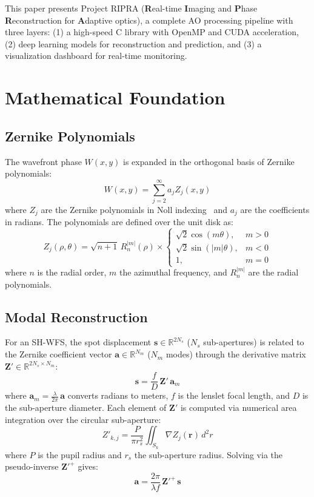 \documentclass[twocolumn,10pt]{IEEEtran}
\begin{document}
This paper presents Project RIPRA (\textbf{R}eal-time \textbf{I}maging and \textbf{P}hase \textbf{R}econstruction for \textbf{A}daptive optics), a complete AO processing pipeline with three layers: (1) a high-speed C library with OpenMP and CUDA acceleration, (2) deep learning models for reconstruction and prediction, and (3) a visualization dashboard for real-time monitoring.

\section{Mathematical Foundation}
\label{sec:math}

\subsection{Zernike Polynomials}
\label{sec:zernike}

The wavefront phase $W(x, y)$ is expanded in the orthogonal basis of Zernike polynomials:
\begin{equation}
W(x, y) = \sum_{j=2}^{\infty} a_j Z_j(x, y)
\end{equation}
where $Z_j$ are the Zernike polynomials in Noll indexing~\cite{noll1976zernike} and $a_j$ are the coefficients in radians. The polynomials are defined over the unit disk as:
\begin{equation}
Z_j(\rho, \theta) = \sqrt{n+1}\,R_n^{|m|}(\rho) \times
\begin{cases}
\sqrt{2}\cos(m\theta), & m > 0 \\
\sqrt{2}\sin(|m|\theta), & m < 0 \\
1, & m = 0
\end{cases}
\end{equation}
where $n$ is the radial order, $m$ the azimuthal frequency, and $R_n^{|m|}$ are the radial polynomials.

\subsection{Modal Reconstruction}
\label{sec:modal}

For an SH-WFS, the spot displacement $\mathbf{s} \in \mathbb{R}^{2N_s}$ ($N_s$ sub-apertures) is related to the Zernike coefficient vector $\mathbf{a} \in \mathbb{R}^{N_m}$ ($N_m$ modes) through the derivative matrix $\mathbf{Z}' \in \mathbb{R}^{2N_s \times N_m}$:
\begin{equation}
\mathbf{s} = \frac{f}{D}\,\mathbf{Z}'\,\mathbf{a}_m
\end{equation}
where $\mathbf{a}_m = \frac{\lambda}{2\pi}\,\mathbf{a}$ converts radians to meters, $f$ is the lenslet focal length, and $D$ is the sub-aperture diameter. Each element of $\mathbf{Z}'$ is computed via numerical area integration over the circular sub-aperture:
\begin{equation}
Z'_{k,j} = \frac{P}{\pi r_s^2}\iint_{S_k} \nabla Z_j(\mathbf{r})\,d^2r
\end{equation}
where $P$ is the pupil radius and $r_s$ the sub-aperture radius. Solving via the pseudo-inverse $\mathbf{Z}'^{+}$ gives:
\begin{equation}
\mathbf{a} = \frac{2\pi}{\lambda f}\,\mathbf{Z}'^{+}\,\mathbf{s}
\end{equation}
\end{document}
